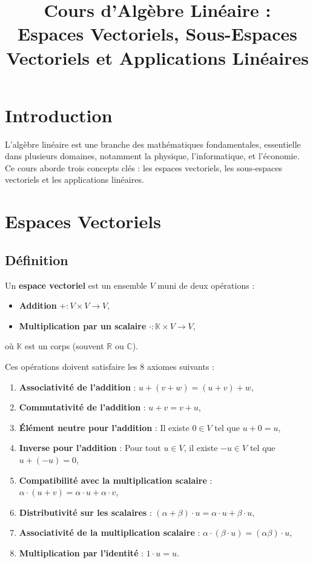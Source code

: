 \documentclass[12pt,a4paper]{article}
\title{Cours d'Algèbre Linéaire : \\ Espaces Vectoriels, Sous-Espaces Vectoriels et Applications Linéaires}
\author{}
\date{}
\begin{document}
\maketitle

\section*{Introduction}
L'algèbre linéaire est une branche des mathématiques fondamentales, essentielle dans plusieurs domaines, notamment la physique, l'informatique, et l'économie. Ce cours aborde trois concepts clés : les espaces vectoriels, les sous-espaces vectoriels et les applications linéaires.

\section{Espaces Vectoriels}
\subsection*{Définition}
Un \textbf{espace vectoriel} est un ensemble \( V \) muni de deux opérations :
\begin{itemize}
    \item \textbf{Addition} \( + : V \times V \to V \),
    \item \textbf{Multiplication par un scalaire} \( \cdot : \mathbb{K} \times V \to V \),
\end{itemize}
où \( \mathbb{K} \) est un corps (souvent \( \mathbb{R} \) ou \( \mathbb{C} \)).

Ces opérations doivent satisfaire les 8 axiomes suivants :
\begin{enumerate}
    \item \textbf{Associativité de l'addition} : \( u + (v + w) = (u + v) + w \),
    \item \textbf{Commutativité de l'addition} : \( u + v = v + u \),
    \item \textbf{Élément neutre pour l'addition} : Il existe \( 0 \in V \) tel que \( u + 0 = u \),
    \item \textbf{Inverse pour l'addition} : Pour tout \( u \in V \), il existe \( -u \in V \) tel que \( u + (-u) = 0 \),
    \item \textbf{Compatibilité avec la multiplication scalaire} : \( \alpha \cdot (u + v) = \alpha \cdot u + \alpha \cdot v \),
    \item \textbf{Distributivité sur les scalaires} : \( (\alpha + \beta) \cdot u = \alpha \cdot u + \beta \cdot u \),
    \item \textbf{Associativité de la multiplication scalaire} : \( \alpha \cdot (\beta \cdot u) = (\alpha \beta) \cdot u \),
    \item \textbf{Multiplication par l'identité} : \( 1 \cdot u = u \).
\end{enumerate}
\end{document}
